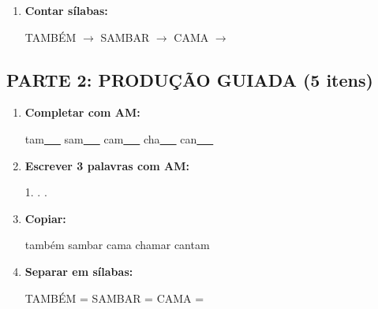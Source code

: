 \begin{exercicio}
\begin{enumerate}
  \item \textbf{Contar sílabas:}
  \begin{center}
  TAMBÉM $\rightarrow$ \underline{\hspace{0.9cm}} \quad SAMBAR $\rightarrow$ \underline{\hspace{0.9cm}} \quad CAMA $\rightarrow$ \underline{\hspace{0.9cm}}
  \end{center}

\end{enumerate}

\subsection*{PARTE 2: PRODUÇÃO GUIADA (5 itens)}

\begin{enumerate}[resume]

  \item \textbf{Completar com AM:}
  \begin{center}
  tam\underline{~~~} \quad sam\underline{~~~} \quad cam\underline{~~~} \quad cha\underline{~~~} \quad can\underline{~~~}
  \end{center}

  \item \textbf{Escrever 3 palavras com AM:}
  \begin{center}
  1. \underline{\hspace{3cm}} . \underline{\hspace{3cm}} . \underline{\hspace{3cm}}
  \end{center}

  \item \textbf{Copiar:}
  \begin{center}
  também \quad sambar \quad cama \quad chamar \quad cantam
  \end{center}

  \item \textbf{Separar em sílabas:}
  \begin{center}
  TAMBÉM = \underline{\hspace{1cm}} \underline{\hspace{1cm}} \quad SAMBAR = \underline{\hspace{1cm}} \underline{\hspace{1cm}} \quad CAMA = \underline{\hspace{1cm}} \underline{\hspace{1cm}}
  \end{center}


\end{enumerate}
\end{exercicio}
